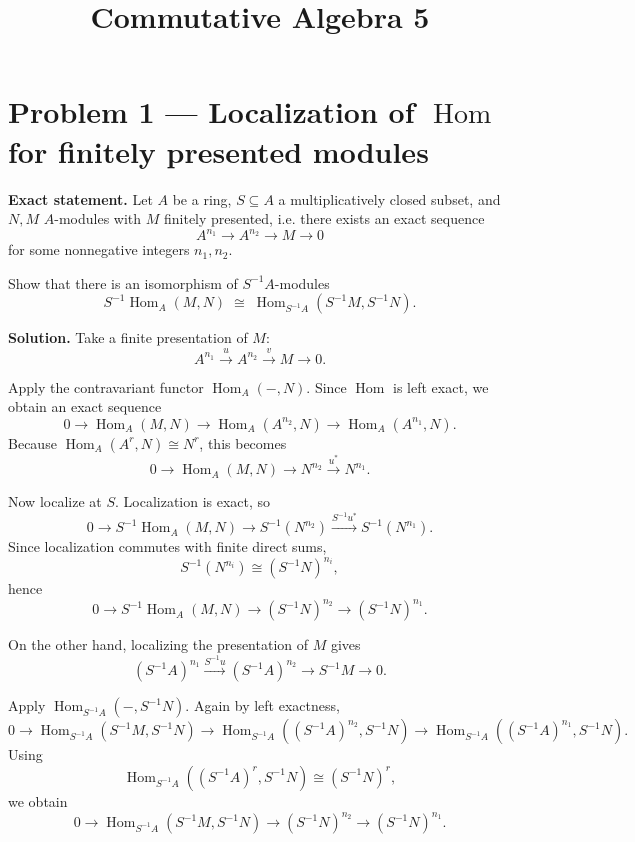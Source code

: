 \documentclass[12pt,a4paper]{article}
\title{Commutative Algebra 5}
\author{}
\date{}
\theoremstyle{plain}
\theoremstyle{definition}      %
\begin{document}
	\maketitle
	
	
\section*{Problem 1 --- Localization of \texorpdfstring{$\operatorname{Hom}$}{Hom} for finitely presented modules}

\textbf{Exact statement.}
Let \(A\) be a ring, \(S \subseteq A\) a multiplicatively closed subset, and \(N,M\) \(A\)-modules with \(M\) finitely presented, i.e. there exists an exact sequence
\[
A^{n_1}\longrightarrow A^{n_2}\longrightarrow M\longrightarrow 0
\]
for some nonnegative integers \(n_1,n_2\).

Show that there is an isomorphism of \(S^{-1}A\)-modules
\[
S^{-1}\!\operatorname{Hom}_A(M,N)\;\cong\;\operatorname{Hom}_{S^{-1}A}(S^{-1}M,S^{-1}N).
\]

\textbf{Solution.}
Take a finite presentation of \(M\):
\[
A^{n_1}\xrightarrow{u} A^{n_2}\xrightarrow{v} M\to 0.
\]

Apply the contravariant functor \(\operatorname{Hom}_A(-,N)\). Since \(\operatorname{Hom}\) is left exact, we obtain an exact sequence
\[
0\to \operatorname{Hom}_A(M,N)\to \operatorname{Hom}_A(A^{n_2},N)\to \operatorname{Hom}_A(A^{n_1},N).
\]
Because \(\operatorname{Hom}_A(A^r,N)\cong N^r\), this becomes
\[
0\to \operatorname{Hom}_A(M,N)\to N^{n_2}\xrightarrow{u^*} N^{n_1}.
\]

Now localize at \(S\). Localization is exact, so
\[
0\to S^{-1}\operatorname{Hom}_A(M,N)\to S^{-1}(N^{n_2})\xrightarrow{S^{-1}u^*} S^{-1}(N^{n_1}).
\]
Since localization commutes with finite direct sums,
\[
S^{-1}(N^{n_i})\cong (S^{-1}N)^{n_i},
\]
hence
\[
0\to S^{-1}\operatorname{Hom}_A(M,N)\to (S^{-1}N)^{n_2}\to (S^{-1}N)^{n_1}.
\]

On the other hand, localizing the presentation of \(M\) gives
\[
(S^{-1}A)^{n_1}\xrightarrow{S^{-1}u}(S^{-1}A)^{n_2}\to S^{-1}M\to 0.
\]

Apply \(\operatorname{Hom}_{S^{-1}A}(-,S^{-1}N)\). Again by left exactness,
\[
0\to \operatorname{Hom}_{S^{-1}A}(S^{-1}M,S^{-1}N)\to
\operatorname{Hom}_{S^{-1}A}((S^{-1}A)^{n_2},S^{-1}N)\to
\operatorname{Hom}_{S^{-1}A}((S^{-1}A)^{n_1},S^{-1}N).
\]
Using
\[
\operatorname{Hom}_{S^{-1}A}((S^{-1}A)^r,S^{-1}N)\cong (S^{-1}N)^r,
\]
we obtain
\[
0\to \operatorname{Hom}_{S^{-1}A}(S^{-1}M,S^{-1}N)\to
(S^{-1}N)^{n_2}\to (S^{-1}N)^{n_1}.
\]
\end{document}
